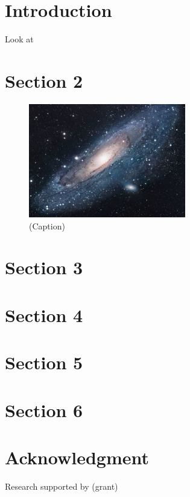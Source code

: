 \documentclass[11pt,a4paper]{article}
\begin{document}

\def\neg{\negthinspace}
\def\d{\mathrm d}
\def\C{{\Bbb C}}
\def\HH{{\mathbb H}}
\def\P{{\mathcal P}}
\def\NS{{\sf{NS}}}
\def\Ra{{\sf{R}}}
\def\sV{{\sf V}}
\def\Z{{\Bbb Z}}
\def\A{{\eusm A}}
\def\B{{\eusm B}}
\def\S{{\mathcal S}}
\def\bar{\overline}
\def\sc{{\mathrm{sc}}}
\def\Max{{\mathrm{Max}}}
\def\CS{{\mathrm{CS}}}
\def\ga{\gamma}
\def\bg{\bar\ga}
\def\W{{\mathcal W}}
\def\M{{\mathcal M}}
\def\bM{{\overline \M}}
\def\L{{\mathcal L}}
\def\sM{{\sf M}}
\def\JT{{\mathrm{JT}}}
\def\gst{\mathrm{g}_{\mathrm{st}}}
\def\gstt{\widetilde{\mathrm{g}}_{\mathrm{st}}}
\def\veps{\varepsilon}


\def\be{\begin{equation}}
\def\ee{\end{equation}}

\tableofcontents

\section{Introduction}\label{intro}
Look at \cite{adams1995hitchhiker}

\section{Section 2}\label{sectwo}
\begin{figure}
 \begin{center}
   \includegraphics[width=2.7in]{images/universe.jpg}
 \end{center}
\caption{\small (Caption)
\label{universe}}
\end{figure}

\section{Section 3}\label{secthree}

\section{Section 4}\label{secfour}

\section{Section 5}\label{secfive}

\section{Section 6}\label{secsix}


\section*{\large Acknowledgment}\label{acknowledgment}
Research supported by (grant)


\printbibliography
\end{document}
